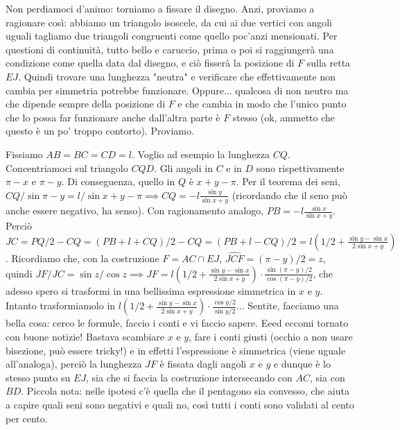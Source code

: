 \begin{sol}
  Non perdiamoci d'animo: torniamo a fissare il disegno. Anzi, proviamo a ragionare così: abbiamo un triangolo isoscele, da cui ai due vertici con angoli uguali tagliamo due triangoli congruenti come quello poc'anzi mensionati. Per questioni di continuità, tutto bello e caruccio, prima o poi si raggiungerà una condizione come quella data dal disegno, e ciò fisserà la posizione di $F$ sulla retta $EJ$. Quindi trovare una lunghezza "neutra" e verificare che effettivamente non cambia per simmetria potrebbe funzionare. Oppure... qualcosa di non neutro ma che dipende sempre della posizione di $F$ e che cambia in modo che l'unico punto che lo possa far funzionare anche dall'altra parte è $F$ stesso (ok, ammetto che questo è un po' troppo contorto). Proviamo.

  Fissiamo $AB=BC=CD=l$. Voglio ad esempio la lunghezza $CQ$. Concentriamoci sul triangolo $CQD$. Gli angoli in $C$ e in $D$ sono rispettivamente $\pi-x$ e $\pi-y$. Di conseguenza, quello in $Q$ è $x+y-\pi$. Per il teorema dei seni, $CQ/\sin{\pi-y}=l/\sin{x+y-\pi} \implies CQ=-l\frac{\sin{y}}{\sin{x+y}}$ (ricordando che il seno può anche essere negativo, ha senso). Con ragionamento analogo, $PB=-l\frac{\sin{x}}{\sin{x+y}}$.
  Perciò $JC=PQ/2-CQ=(PB+l+CQ)/2-CQ=(PB+l-CQ)/2=l\left(1/2+\frac{\sin{y}-\sin{x}}{2\sin{x+y}}\right)$.
  Ricordiamo che, con la costruzione $F=AC \cap EJ$, $\widehat{JCF}=(\pi-y)/2=z$, quindi $JF/JC=\sin{z}/\cos{z} \implies JF=l\left(1/2+\frac{\sin{y}-\sin{x}}{2\sin{x+y}}\right) \cdot \frac{\sin{(\pi-y)/2}}{\cos{(\pi-y)/2}}$, che adesso spero si trasformi in una bellissima espressione simmetrica in $x$ e $y$.
  Intanto trasformiamolo in $l\left(1/2+\frac{\sin{y}-\sin{x}}{2\sin{x+y}}\right) \cdot \frac{\cos{y/2}}{\sin{y/2}}$... Sentite, facciamo una bella cosa: cerco le formule, faccio i conti e vi faccio sapere. Eeed eccomi tornato con buone notizie! Bastava scambiare $x$ e $y$, fare i conti giusti (occhio a non usare bisezione, può essere tricky!) e in effetti l'espressione è simmetrica (viene uguale all'analoga), perciò la lunghezza $JF$ è fissata dagli angoli $x$ e $y$ e dunque è lo stesso punto su $EJ$, sia che si faccia la costruzione intersecando con $AC$, sia con $BD$. Piccola nota: nelle ipotesi c'è quella che il pentagono sia convesso, che aiuta a capire quali seni sono negativi e quali no, così tutti i conti sono validati al cento per cento.
\end{sol}
